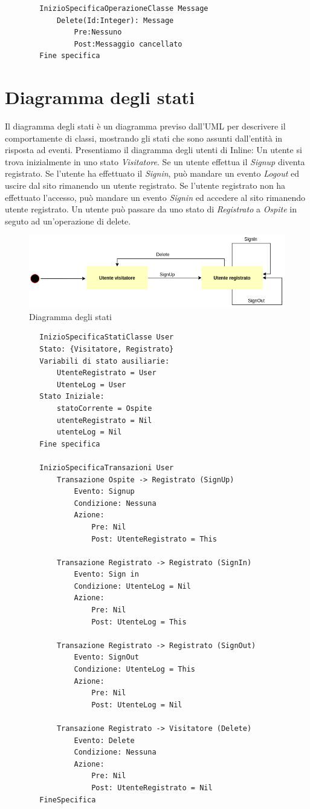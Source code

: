 	\begin{lstlisting}
		InizioSpecificaOperazioneClasse Message
			Delete(Id:Integer): Message
				Pre:Nessuno
				Post:Messaggio cancellato
		Fine specifica
	\end{lstlisting}
	
	\section{Diagramma degli stati}
	Il diagramma degli stati è un diagramma previso dall'UML per descrivere il comportamente di classi, mostrando gli stati che sono assunti dall'entità in risposta ad eventi.
	Presentiamo il diagramma degli utenti di Inline: Un utente si trova inizialmente in uno stato \textit{Visitatore}. Se un utente effettua il \textit{Signup} diventa registrato. Se l'utente ha effettuato il \textit{Signin}, può mandare un evento \textit{Logout} ed uscire dal sito rimanendo un utente registrato. Se l'utente registrato non ha effettuato l'accesso, può mandare un evento \textit{Signin} ed accedere al sito rimanendo utente registrato. Un utente può passare da uno stato di \textit{Registrato} a \textit{Ospite} in seguto ad un'operazione di delete.
	
	\begin{figure}[H]
		\centering
		\includegraphics[width=\textwidth]{./media/DiagrammaStati.png}
		\caption{Diagramma degli stati}
	\end{figure}
	
	\begin{lstlisting}
		InizioSpecificaStatiClasse User
		Stato: {Visitatore, Registrato}
		Variabili di stato ausiliarie:
			UtenteRegistrato = User
			UtenteLog = User
		Stato Iniziale:
			statoCorrente = Ospite
			utenteRegistrato = Nil
			utenteLog = Nil
		Fine specifica
	
		InizioSpecificaTransazioni User
			Transazione Ospite -> Registrato (SignUp)
				Evento: Signup
				Condizione: Nessuna
				Azione: 
					Pre: Nil
					Post: UtenteRegistrato = This
			
			Transazione Registrato -> Registrato (SignIn)
				Evento: Sign in
				Condizione: UtenteLog = Nil
				Azione:
					Pre: Nil
					Post: UtenteLog = This
			
			Transazione Registrato -> Registrato (SignOut)
				Evento: SignOut
				Condizione: UtenteLog = This
				Azione:
					Pre: Nil
					Post: UtenteLog = Nil
			
			Transazione Registrato -> Visitatore (Delete)
				Evento: Delete
				Condizione: Nessuna
				Azione:
					Pre: Nil
					Post: UtenteRegistrato = Nil
		FineSpecifica	
	\end{lstlisting}
	
